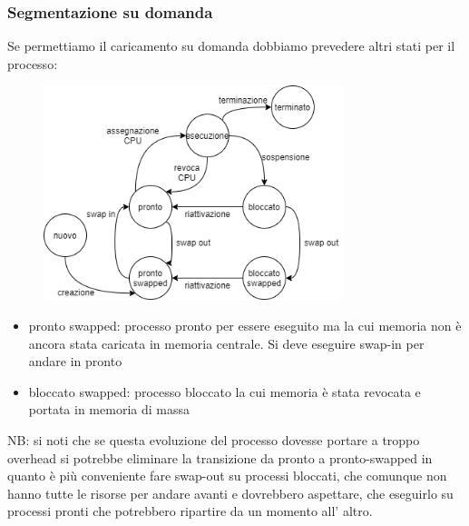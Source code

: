 \subsubsection{Segmentazione su domanda}
Se permettiamo il caricamento su domanda dobbiamo prevedere altri stati per il processo:
\begin{figure}[H]
    \centering
    \includegraphics[width=330px]{images/9_Gestione_della_memoria/process_evolution_with_swap.png}
\end{figure}
\begin{itemize}
    \item pronto swapped: processo pronto per essere eseguito ma la cui memoria non è ancora stata caricata in memoria centrale.
    Si deve eseguire swap-in per andare in pronto
    \item bloccato swapped: processo bloccato la cui memoria è stata revocata e portata in memoria di massa
\end{itemize}
NB: si noti che se questa evoluzione del processo dovesse portare a troppo overhead si potrebbe eliminare la transizione da pronto a pronto-swapped in quanto è più conveniente fare swap-out su processi bloccati, che comunque non hanno tutte le risorse per andare avanti e dovrebbero aspettare, che eseguirlo su processi pronti che potrebbero ripartire da un momento all' altro.

